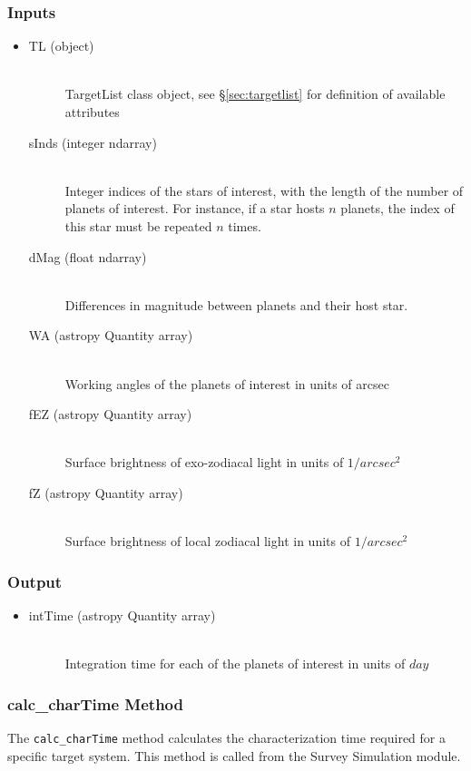\documentclass[cleanfoot]{asme2ej}
\begin{document}
\subsubsection*{Inputs}
\begin{itemize}
    \item 
    \begin{description}
        \item[TL (object)] \hfill \\ TargetList class object, see \S\ref{sec:targetlist} for definition of available attributes
        \item[sInds (integer ndarray)] \hfill \\ Integer indices of the stars of interest, with the length of the number of planets of interest. For instance, if a star hosts $ n $ planets, the index of this star must be repeated $ n $ times.
        \item[dMag (float ndarray)] \hfill \\ Differences in magnitude between planets and their host star.
        \item[WA (astropy Quantity array)] \hfill \\ Working angles of the planets of interest in units of arcsec
        \item[fEZ (astropy Quantity array)] \hfill \\ Surface brightness of exo-zodiacal light in units of $ 1/arcsec^2 $
        \item[fZ (astropy Quantity array)] \hfill \\ Surface brightness of local zodiacal light in units of $ 1/arcsec^2 $
    \end{description}
\end{itemize}
\subsubsection*{Output}
\begin{itemize}
    \item 
    \begin{description}
        \item[intTime (astropy Quantity array)] \hfill \\ Integration time for each of the planets of interest in units of $ day $
    \end{description}
\end{itemize}

\subsubsection{calc\_charTime Method} \label{sec:calccharTimetask}
The \verb+calc_charTime+ method calculates the characterization time required for a specific target system.  This method is called from the Survey Simulation module.
\end{document}
